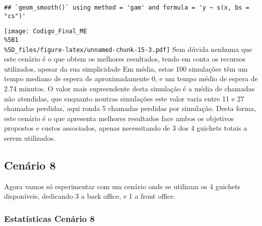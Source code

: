 \documentclass[
]{article}
\newenvironment{Shaded}{\begin{snugshade}}{\end{snugshade}}
\newcommand{\AttributeTok}[1]{\textcolor[rgb]{0.13,0.29,0.53}{#1}}
\newcommand{\CommentTok}[1]{\textcolor[rgb]{0.56,0.35,0.01}{\textit{#1}}}
\newcommand{\FunctionTok}[1]{\textcolor[rgb]{0.13,0.29,0.53}{\textbf{#1}}}
\newcommand{\NormalTok}[1]{#1}
\newcommand{\OtherTok}[1]{\textcolor[rgb]{0.56,0.35,0.01}{#1}}
\newcommand{\SpecialCharTok}[1]{\textcolor[rgb]{0.81,0.36,0.00}{\textbf{#1}}}
\newcommand{\StringTok}[1]{\textcolor[rgb]{0.31,0.60,0.02}{#1}}
\begin{document}
\begin{verbatim}
## `geom_smooth()` using method = 'gam' and formula = 'y ~ s(x, bs = "cs")'
\end{verbatim}

\texttt{[image: Codigo\_Final\_ME\\\%5B1\\\%5D\_files/figure-latex/unnamed-chunk-15-3.pdf]}
Sem dúvida nenhuma que este cenário é o que obtem os melhores
resultados, tendo em conta os recursos utilizados, apesar da sua
simplicidade Em média, estas 100 simulações têm um tempo mediano de
espera de aproximadamente 0, e um tempo médio de espera de 2.74 minutos.
O valor mais supreendente desta simulação é a média de chamadas não
atendidas, que enquanto noutras simulações este valor varia entre 11 e
27 chamadas perdidas, aqui ronda 5 chamadas perdidas por simulação.
Desta forma, este cenário é o que apresenta melhores resultados face
ambos os objetivos propostos e custos associados, apenas necessitando de
3 dos 4 guichets totais a serem utilizados.

\subsection{Cenário 8}\label{cenuxe1rio-8}

Agora vamos só esperimentar com um cenário onde se utilizam os 4
guichets disponíveis, dedicando 3 a back office, e 1 a front office.

\subsubsection{Estatísticas Cenário
8}\label{estatuxedsticas-cenuxe1rio-8}

\begin{Shaded}
\end{Shaded}
\end{document}

